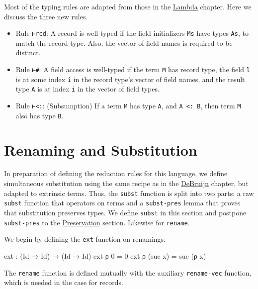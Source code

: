 Most of the typing rules are adapted from those in the
\protect\hyperlink{Lambda}{Lambda} chapter. Here we discuss the three
new rules.

\begin{itemize}
\item
  Rule \texttt{⊢rcd}: A record is well-typed if the field initializers
  \texttt{Ms} have types \texttt{As}, to match the record type. Also,
  the vector of field names is required to be distinct.
\item
  Rule \texttt{⊢\#}: A field access is well-typed if the term \texttt{M}
  has record type, the field \texttt{l} is at some index \texttt{i} in
  the record type's vector of field names, and the result type
  \texttt{A} is at index \texttt{i} in the vector of field types.
\item
  Rule \texttt{⊢\textless{}:}: (Subsumption) If a term \texttt{M} has
  type \texttt{A}, and \texttt{A\ \textless{}:\ B}, then term \texttt{M}
  also has type \texttt{B}.
\end{itemize}

\hypertarget{renaming-and-substitution}{%
\section{Renaming and Substitution}\label{renaming-and-substitution}}

In preparation of defining the reduction rules for this language, we
define simultaneous substitution using the same recipe as in the
\protect\hyperlink{DeBruijn}{DeBruijn} chapter, but adapted to extrinsic
terms. Thus, the \texttt{subst} function is split into two parts: a raw
\texttt{subst} function that operators on terms and a
\texttt{subst-pres} lemma that proves that substitution preserves types.
We define \texttt{subst} in this section and postpone
\texttt{subst-pres} to the
\protect\hyperlink{subtyping-preservation}{Preservation} section.
Likewise for \texttt{rename}.

We begin by defining the \texttt{ext} function on renamings.

\begin{fence}
\begin{code}
ext : (Id → Id) → (Id → Id)
ext ρ 0      =  0
ext ρ (suc x)  =  suc (ρ x)
\end{code}
\end{fence}

The \texttt{rename} function is defined mutually with the auxiliary
\texttt{rename-vec} function, which is needed in the case for records.

